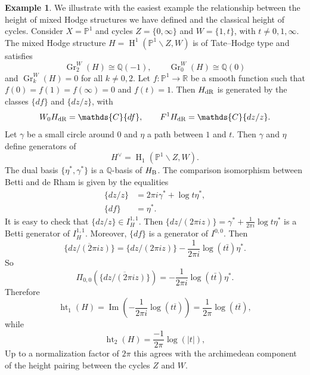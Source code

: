 \documentclass[11pt,a4paper]{amsart}
\newcommand{\Betti}{\text{\rm B}}
\newcommand{\dR}{\text{\rm dR}}
\newcommand{\C}{\mathds{C}}
\renewcommand{\P}{\mathds{P}}
\newcommand{\Q}{\mathds{Q}}
\newcommand{\R}{\mathds{R}}
\DeclareMathOperator {\Gr} {Gr}
\DeclareMathOperator{\im}{Im}
\DeclareMathOperator{\Ht}{ht}
\DeclareMathOperator{\rH}{H}
\numberwithin{equation}{section}
\theoremstyle{plain}
\theoremstyle{definition}
\newtheorem{ex}[prop]{Example}
\begin{document}
\begin{ex}\label{exm:13} We illustrate with the easiest example the
  relationship between the height of mixed Hodge structures we have
  defined and the classical height of cycles. Consider $X=\P^{1}$ and
  cycles $Z=\{0,\infty\}$ and $W=\{1,t\}$, with $t\not =
  0,1,\infty$. The mixed Hodge structure 
  $H=\rH^{1}(\P^{1}\smallsetminus Z,W)$ is of Tate--Hodge type and
  satisfies
  \begin{displaymath}
    \Gr_{2}^{W}(H)\cong \Q(-1),\qquad
    \Gr_{0}^{W}(H)\cong \Q(0)
  \end{displaymath}
  and $\Gr_{k}^{W}(H)=0$ for all $k\not = 0,2$. Let $f\colon \P^{1}\to
  \R$ be a smooth function such that $f(0)=f(1)=f(\infty)=0$ and $f(t)=1$. Then
  $H_{\dR}$ is generated by the classes $\{df\}$ and $\{dz/z\}$,
  with
  \begin{displaymath}
    W_{0}H_{\dR}=\C \{df\},\qquad F^{1} H_{\dR}=\C \{dz/z\}.
  \end{displaymath}
  Let
  $\gamma $ be a small circle around $0$ and $\eta$ a path between $1$
  and $t$. Then $\gamma $ and $\eta$  define generators of
  \begin{displaymath}
    H^{\vee}=\rH_{1}(\P^{1}\smallsetminus Z,W).
  \end{displaymath}
  The dual basis $\{\eta^{\ast},\gamma ^{\ast}\}$ is a $\Q$-basis of
  $H_{\Betti}$. The comparison isomorphism between Betti and de Rham
  is given by the equalities
  \begin{align*}
    \{dz/z\}&=2\pi i \gamma ^{\ast}+\log t \eta^{\ast},\\
    \{df\}&=\eta^{\ast}.
  \end{align*}
  It is easy to check that $\{dz/z\}\in I^{1,1}_{H}$. Then
  $\{dz/(2\pi iz)\}=\gamma ^{\ast}+\frac{1}{2\pi i}\log t \eta^{\ast}$
  is a Betti generator of $I^{1,1}_{H}$. Moreover, $\{df\}$ is a
  generator of $I^{0,0}$. Then
  \begin{displaymath}
    \overline{\{dz/(2\pi iz)\}}=\{dz/(2\pi iz)\}-\frac{1}{2\pi i}\log
    (t\bar t) \eta^{\ast}.
  \end{displaymath}
  So
  \begin{displaymath}
    \Pi _{0,0}(\overline{\{dz/(2\pi iz)\}})=-\frac{1}{2\pi i}\log
    (t\bar t) \eta^{\ast}.
  \end{displaymath}
  Therefore
  \begin{displaymath}
    \Ht_{1}(H)=\im(-\frac{1}{2\pi i}\log
    (t\overline t) )=\frac{1}{2\pi }\log(t\bar t),
  \end{displaymath}
  while
  \begin{displaymath}
    \Ht_{2}(H)=\frac{-1}{2\pi }\log(|t|),    
  \end{displaymath}
  Up to a normalization factor of $2\pi $ this agrees with the archimedean
  component of the height pairing between the cycles $Z$ and $W$.  
\end{ex}
\end{document}
